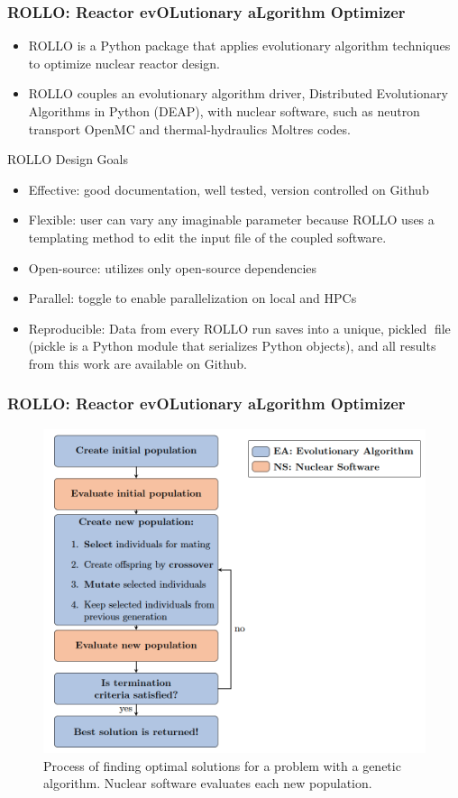 \begin{frame}
    \frametitle{ROLLO: Reactor evOLutionary aLgorithm Optimizer}
    \begin{itemize}
        \item ROLLO is a Python package that applies evolutionary algorithm
        techniques to optimize nuclear reactor design.
        \item ROLLO couples an evolutionary algorithm driver, Distributed 
        Evolutionary Algorithms in Python (DEAP), with 
        nuclear software, such as neutron transport OpenMC and thermal-hydraulics 
        Moltres codes.
    \end{itemize}
    \begin{block}{ROLLO Design Goals}
        \begin{itemize}
            \item Effective: good documentation, well tested, version controlled 
            on Github 
            \item Flexible: user can vary any imaginable parameter because
            ROLLO uses a templating method to edit the input file of the coupled software.
            \item Open-source: utilizes only open-source dependencies 
            \item Parallel: toggle to enable parallelization on local and HPCs
            \item Reproducible: Data from every ROLLO run saves into a unique, 
            pickled file (pickle is a Python module that serializes Python 
            objects), and all results from this work are available on Github.
        \end{itemize}
    \end{block}
\end{frame}

\begin{frame}
    \frametitle{ROLLO: Reactor evOLutionary aLgorithm Optimizer}
    \begin{figure}
        \includegraphics[width=0.8\linewidth]{figures/rollo-flow.png} 
        \caption{Process of finding optimal solutions for a problem with a 
        genetic algorithm. Nuclear software evaluates each new population.}
    \end{figure}
\end{frame}

